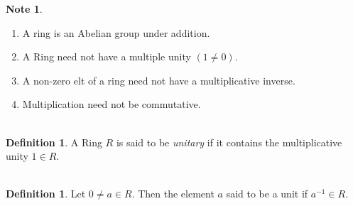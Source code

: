 \documentclass[11pt,a4paper]{article}
\theoremstyle{definition}
\newtheorem{defn}[thm]{Definition}
\newtheorem*{note}{Note}
\begin{document}
\begin{note}
\begin{enumerate}
\item[•] A ring  is an Abelian group under addition.
\item[•] A Ring need not have a multiple unity $(1\neq 0)$.
\item[•] A non-zero elt of a ring need not have a multiplicative inverse.
\item[•] Multiplication need not be commutative.\\\\
\end{enumerate}
\end{note}






\begin{defn}
A Ring $R$ is said to be \textit{unitary} if it contains the multiplicative unity $1\in R$.\\\\
\end{defn}





\begin{defn}
Let $0\neq a\in R$. Then the element $a$  said to be a  unit if $a^{-1} \in R$.\\\\
\end{defn}
\end{document}
